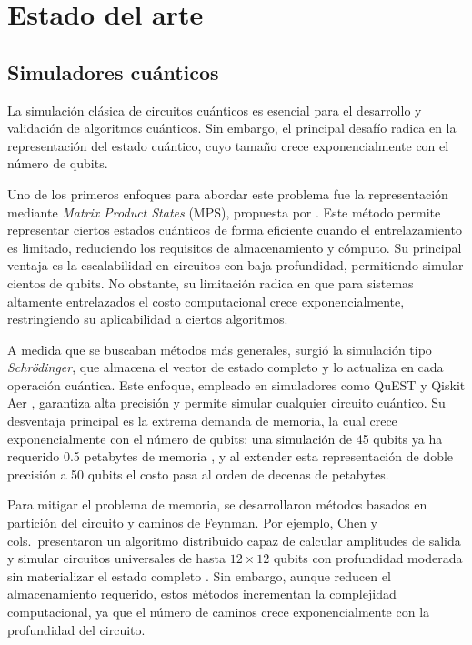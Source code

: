 \section{Estado del arte}

\subsection{\normalsize Simuladores cuánticos}
La simulación clásica de circuitos cuánticos es esencial para el desarrollo y
validación de algoritmos cuánticos. Sin embargo, el principal desafío radica
en la representación del estado cuántico, cuyo tamaño crece exponencialmente con
el número de qubits.

Uno de los primeros enfoques para abordar este problema fue la representación
mediante \textit{Matrix Product States} (MPS), propuesta por \textcite{Vidal2003}.
Este método permite representar ciertos estados cuánticos de forma eficiente
cuando el entrelazamiento es limitado, reduciendo los requisitos de almacenamiento
y cómputo. Su principal ventaja es la escalabilidad en circuitos con baja
profundidad, permitiendo simular cientos de qubits. No obstante, su limitación
radica en que para sistemas altamente entrelazados el costo computacional crece
exponencialmente, restringiendo su aplicabilidad a ciertos algoritmos.

A medida que se buscaban métodos más generales, surgió la simulación tipo
\textit{Schrödinger}, que almacena el vector de estado completo y lo actualiza
en cada operación cuántica. Este enfoque, empleado en simuladores como QuEST y
Qiskit Aer \cite{Jones2019, qiskit_aer_doc}, garantiza alta precisión y permite simular cualquier
circuito cuántico. Su desventaja principal es la extrema demanda de memoria, la
cual crece exponencialmente con el número de qubits: una simulación de 45 qubits
ya ha requerido 0.5 petabytes de memoria \cite{Haner2017}, y al extender esta
representación de doble precisión a 50 qubits el costo pasa al orden de decenas de
petabytes.

Para mitigar el problema de memoria, se desarrollaron métodos basados en
partición del circuito y caminos de Feynman. Por ejemplo, Chen y cols.\
presentaron un algoritmo distribuido capaz
de calcular amplitudes de salida y simular circuitos universales de hasta
$12\times12$ qubits con profundidad moderada sin materializar el estado completo
\cite{Chen2018}. Sin embargo, aunque reducen el
almacenamiento requerido, estos métodos incrementan la complejidad computacional,
ya que el número de caminos crece exponencialmente con la profundidad del
circuito.

